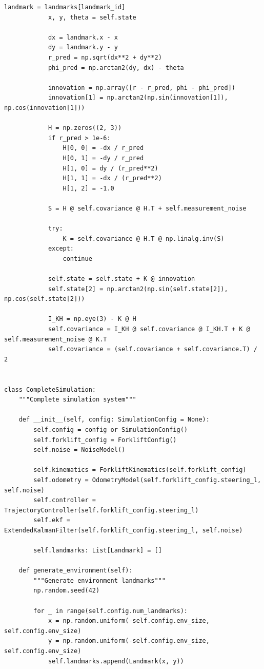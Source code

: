 \documentclass[12pt,a4paper]{report}
\begin{document}
\begin{lstlisting}[caption={Complete Simulation System (complete\_simulation.py)}]
            landmark = landmarks[landmark_id]
            x, y, theta = self.state
            
            dx = landmark.x - x
            dy = landmark.y - y
            r_pred = np.sqrt(dx**2 + dy**2)
            phi_pred = np.arctan2(dy, dx) - theta
            
            innovation = np.array([r - r_pred, phi - phi_pred])
            innovation[1] = np.arctan2(np.sin(innovation[1]), np.cos(innovation[1]))
            
            H = np.zeros((2, 3))
            if r_pred > 1e-6:
                H[0, 0] = -dx / r_pred
                H[0, 1] = -dy / r_pred
                H[1, 0] = dy / (r_pred**2)
                H[1, 1] = -dx / (r_pred**2)
                H[1, 2] = -1.0
            
            S = H @ self.covariance @ H.T + self.measurement_noise
            
            try:
                K = self.covariance @ H.T @ np.linalg.inv(S)
            except:
                continue
            
            self.state = self.state + K @ innovation
            self.state[2] = np.arctan2(np.sin(self.state[2]), np.cos(self.state[2]))
            
            I_KH = np.eye(3) - K @ H
            self.covariance = I_KH @ self.covariance @ I_KH.T + K @ self.measurement_noise @ K.T
            self.covariance = (self.covariance + self.covariance.T) / 2


class CompleteSimulation:
    """Complete simulation system"""
    
    def __init__(self, config: SimulationConfig = None):
        self.config = config or SimulationConfig()
        self.forklift_config = ForkliftConfig()
        self.noise = NoiseModel()
        
        self.kinematics = ForkliftKinematics(self.forklift_config)
        self.odometry = OdometryModel(self.forklift_config.steering_l, self.noise)
        self.controller = TrajectoryController(self.forklift_config.steering_l)
        self.ekf = ExtendedKalmanFilter(self.forklift_config.steering_l, self.noise)
        
        self.landmarks: List[Landmark] = []
        
    def generate_environment(self):
        """Generate environment landmarks"""
        np.random.seed(42)
        
        for _ in range(self.config.num_landmarks):
            x = np.random.uniform(-self.config.env_size, self.config.env_size)
            y = np.random.uniform(-self.config.env_size, self.config.env_size)
            self.landmarks.append(Landmark(x, y))
    

\end{lstlisting}
\end{document}
